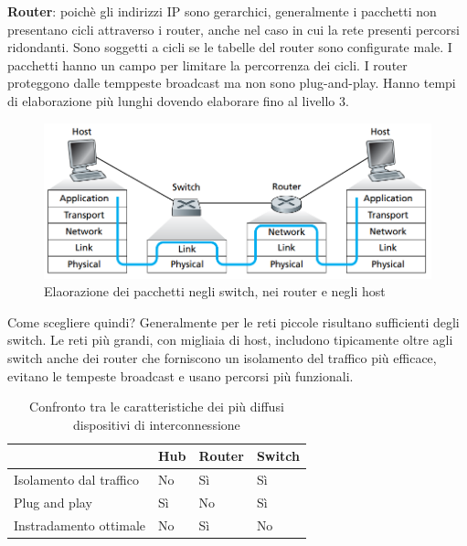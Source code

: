 \documentclass[11pt,a4paper]{article}
\begin{document}
\textbf{Router}: poichè gli indirizzi IP sono gerarchici, generalmente i pacchetti non presentano cicli attraverso i router, anche nel caso in cui la rete presenti percorsi ridondanti. Sono soggetti a cicli se le tabelle del router sono configurate male. I pacchetti hanno un campo per limitare la percorrenza dei cicli. I router proteggono dalle temppeste broadcast ma non sono plug-and-play. Hanno tempi di elaborazione più lunghi dovendo elaborare fino al livello 3.
\begin{figure}
	\includegraphics[scale=0.35]{img/087.png}
	\caption{Elaorazione dei pacchetti negli switch, nei router e negli host}
	\label{fig: 087}
\end{figure}

Come scegliere quindi? Generalmente per le reti piccole risultano sufficienti degli switch. Le reti più grandi, con migliaia di host, includono tipicamente oltre agli switch anche dei router che forniscono un isolamento del traffico più efficace, evitano le tempeste broadcast e usano percorsi più funzionali.
\begin{table}[]
	\begin{tabular}{|l|l|l|l|}
		\hline
                        & \multicolumn{1}{c|}{\textbf{Hub}} & \multicolumn{1}{c|}{\textbf{Router}} & \multicolumn{1}{c|}{\textbf{Switch}} \\ \hline
Isolamento dal traffico & No                                & Sì                                   & Sì                                   \\ \hline
Plug and play           & Sì                                & No                                   & Sì                                   \\ \hline
Instradamento ottimale  & No                                & Sì                                   & No                                   \\ \hline
	\end{tabular}
	\caption{Confronto tra le caratteristiche dei più diffusi dispositivi di interconnessione}
	\label{tab: 004}
\end{table}
\end{document}
